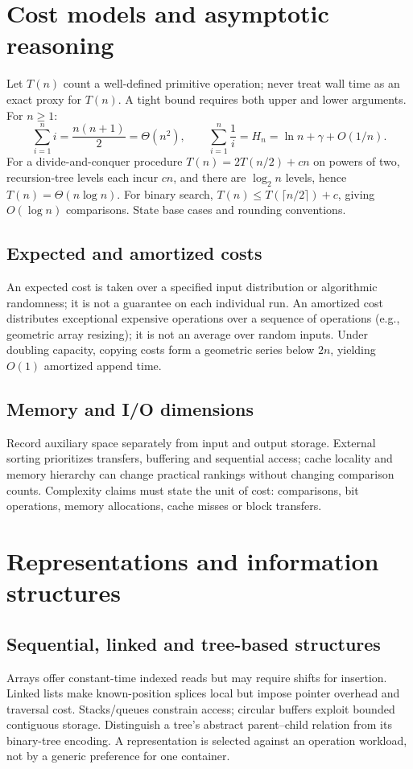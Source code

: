 \documentclass[11pt,letterpaper]{article}
\begin{document}
\section{Cost models and asymptotic reasoning}
Let $T(n)$ count a well-defined primitive operation; never treat wall time as an exact proxy for $T(n)$. A tight bound requires both upper and lower arguments. For $n\ge 1$:
\[\sum_{i=1}^{n}i=\frac{n(n+1)}2=\Theta(n^2),\qquad
\sum_{i=1}^{n}\frac1i = H_n = \ln n + \gamma+O(1/n).\]
For a divide-and-conquer procedure $T(n)=2T(n/2)+cn$ on powers of two, recursion-tree levels each incur $cn$, and there are $\log_2 n$ levels, hence $T(n)=\Theta(n\log n)$. For binary search, $T(n)\le T(\lceil n/2\rceil)+c$, giving $O(\log n)$ comparisons. State base cases and rounding conventions.
\subsection{Expected and amortized costs}
An expected cost is taken over a specified input distribution or algorithmic randomness; it is not a guarantee on each individual run. An amortized cost distributes exceptional expensive operations over a sequence of operations (e.g., geometric array resizing); it is not an average over random inputs. Under doubling capacity, copying costs form a geometric series below $2n$, yielding $O(1)$ amortized append time.
\subsection{Memory and I/O dimensions}
Record auxiliary space separately from input and output storage. External sorting prioritizes transfers, buffering and sequential access; cache locality and memory hierarchy can change practical rankings without changing comparison counts. Complexity claims must state the unit of cost: comparisons, bit operations, memory allocations, cache misses or block transfers.
\section{Representations and information structures}
\subsection{Sequential, linked and tree-based structures}
Arrays offer constant-time indexed reads but may require shifts for insertion. Linked lists make known-position splices local but impose pointer overhead and traversal cost. Stacks/queues constrain access; circular buffers exploit bounded contiguous storage. Distinguish a tree's abstract parent--child relation from its binary-tree encoding. A representation is selected against an operation workload, not by a generic preference for one container.
\end{document}
